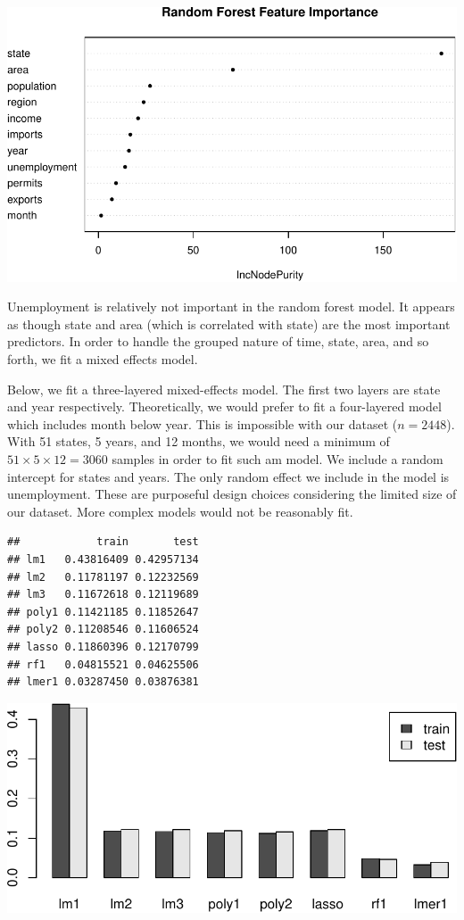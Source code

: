 \documentclass[]{article}
\begin{document}
\begin{center}\includegraphics{stat139_project_final_files/figure-latex/rf-1} \end{center}

Unemployment is relatively not important in the random forest model. It
appears as though state and area (which is correlated with state) are
the most important predictors. In order to handle the grouped nature of
time, state, area, and so forth, we fit a mixed effects model.

Below, we fit a three-layered mixed-effects model. The first two layers
are state and year respectively. Theoretically, we would prefer to fit a
four-layered model which includes month below year. This is impossible
with our dataset (\(n = 2448\)). With 51 states, 5 years, and 12 months,
we would need a minimum of \(51 \times 5 \times 12 = 3060\) samples in
order to fit such am model. We include a random intercept for states and
years. The only random effect we include in the model is unemployment.
These are purposeful design choices considering the limited size of our
dataset. More complex models would not be reasonably fit.

\begin{verbatim}
##            train       test
## lm1   0.43816409 0.42957134
## lm2   0.11781197 0.12232569
## lm3   0.11672618 0.12119689
## poly1 0.11421185 0.11852647
## poly2 0.11208546 0.11606524
## lasso 0.11860396 0.12170799
## rf1   0.04815521 0.04625506
## lmer1 0.03287450 0.03876381
\end{verbatim}

\begin{center}\includegraphics{stat139_project_final_files/figure-latex/rmse-1} \end{center}
\end{document}
